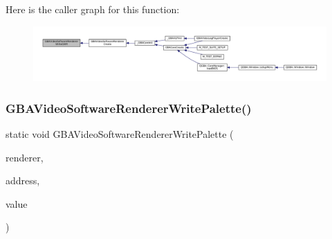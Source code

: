 Here is the caller graph for this function\+:
\nopagebreak
\begin{figure}[H]
\begin{center}
\leavevmode
\includegraphics[width=350pt]{video-software_8c_a3e1a51d28182f9f3b3e2db089e275e2a_icgraph}
\end{center}
\end{figure}
\mbox{\label{video-software_8c_acc8c3b30451a006f57fbfd75bc9582b7}} 
\subsubsection{\texorpdfstring{G\+B\+A\+Video\+Software\+Renderer\+Write\+Palette()}{GBAVideoSoftwareRendererWritePalette()}}
{\footnotesize\ttfamily static void G\+B\+A\+Video\+Software\+Renderer\+Write\+Palette (\begin{DoxyParamCaption}\item[{struct G\+B\+A\+Video\+Renderer $\ast$}]{renderer,  }\item[{uint32\+\_\+t}]{address,  }\item[{uint16\+\_\+t}]{value }\end{DoxyParamCaption})\hspace{0.3cm}{\ttfamily [static]}}

